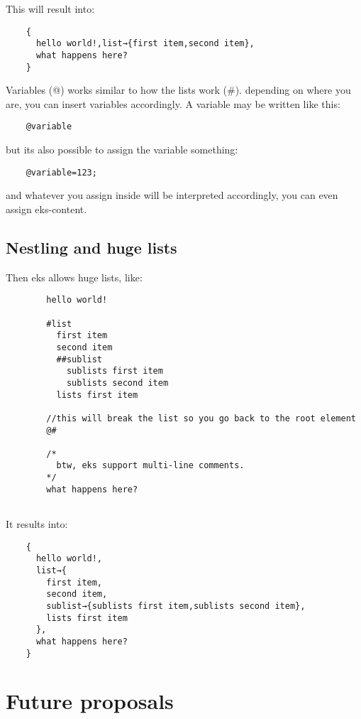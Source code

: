 \documentclass{book}
\begin{document}
	This will result into:
	
	\begin{verbatim}
	{
	  hello world!,list→{first item,second item},
	  what happens here?
	}
	\end{verbatim}
	
	Variables (@) works similar to how the lists work (#).
	depending on where you are, you can insert variables accordingly. A variable may be written like this:
	
	\begin{verbatim}
	@variable
	\end{verbatim}
	
	but its also possible to assign the variable something:
	
	\begin{verbatim}
	@variable=123;
	\end{verbatim}
	
	and whatever you assign inside will be interpreted accordingly, you can even assign eks-content.
	
	\section{Nestling and huge lists}
	
	Then eks allows huge lists, like:
	
	\begin{verbatim}
		hello world!
		
		#list
		  first item
		  second item
		  ##sublist
		    sublists first item
		    sublists second item
		  lists first item
		  
		//this will break the list so you go back to the root element
		@#
		
		/*
		  btw, eks support multi-line comments.
		*/
		what happens here?
		
	\end{verbatim}
	
	It results into:
	
	\begin{verbatim}
	{
	  hello world!,
	  list→{
	    first item,
	    second item,
	    sublist→{sublists first item,sublists second item},
	    lists first item
	  },
	  what happens here?
	}
	\end{verbatim}
	
	\chapter{Future proposals}
	
\end{document}
